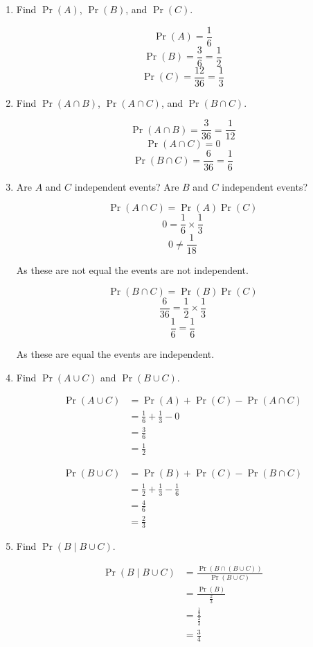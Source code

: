 \documentclass[11pt]{article}
\begin{document}
\begin{enumerate}[label= (\alph*)]
  \item Find $\Pr(A)$, $\Pr(B)$, and $\Pr(C)$.

    \[ \Pr(A) = \frac{1}{6} \]
    \[ \Pr(B) = \frac{3}{6} = \frac{1}{2} \]
    \[ \Pr(C) = \frac{12}{36} = \frac{1}{3} \]

  \item Find $\Pr(A \cap B)$, $\Pr(A \cap C)$, and $\Pr(B \cap C)$.

    \[ \Pr(A \cap B) = \frac{3}{36} = \frac{1}{12} \]
    \[ \Pr(A \cap C) = 0 \]
    \[ \Pr(B \cap C) = \frac{6}{36} = \frac{1}{6} \]

  \item Are $A$ and $C$ independent events? Are $B$ and $C$ independent events?

    \[ \Pr(A \cap C) = \Pr(A)\Pr(C) \]
    \[ 0 = \frac{1}{6} \times \frac{1}{3} \]
    \[ 0 \not = \frac{1}{18} \]

    As these are not equal the events are not independent.

    \[ \Pr(B \cap C) = \Pr(B)\Pr(C) \]
    \[ \frac{6}{36} = \frac{1}{2} \times \frac{1}{3} \]
    \[ \frac{1}{6} = \frac{1}{6} \]

    As these are equal the events are independent.

  \item Find $\Pr(A \cup C)$ and $\Pr(B \cup C)$.

    \begin{align*}
      \Pr(A \cup C) &= \Pr(A) + \Pr(C) - \Pr(A \cap C) \\
      &= \frac{1}{6} + \frac{1}{3} - 0 \\
      &= \frac{3}{6} \\
      &= \frac{1}{2}
    \end{align*}

    \begin{align*}
      \Pr(B \cup C) &= \Pr(B) + \Pr(C) - \Pr(B \cap C) \\
      &= \frac{1}{2} + \frac{1}{3} - \frac{1}{6} \\
      &= \frac{4}{6} \\
      &= \frac{2}{3}
    \end{align*}

  \item Find $\Pr(B \mid B \cup C)$.

    \begin{align*}
      \Pr(B \mid B \cup C) &= \frac{\Pr(B \cap (B \cup C))}{\Pr(B \cup C)} \\
      &= \frac{\Pr(B)}{\frac{2}{3}} \\
      &= \frac{\frac{1}{2}}{\frac{2}{3}} \\
      &= \frac{3}{4}
    \end{align*}
\end{enumerate}
\end{document}
